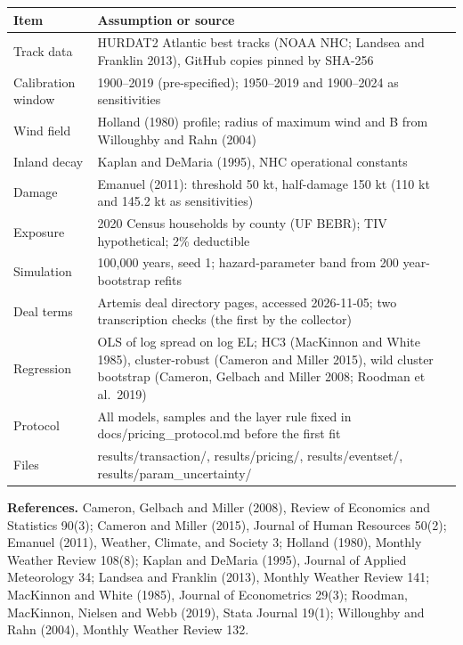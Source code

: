 \documentclass[12pt]{article}
\newcommand{\slide}[1]{\newpage{\color{accent}\Large\textbf{#1}}\par\vspace{2pt}{\color{accent}\rule{\linewidth}{1pt}}\par\vspace{4pt}}
\begin{document}
\slide{Appendix: assumptions and sources}
\small
\begin{tabularx}{\linewidth}{@{}lX@{}}
\toprule
Item & Assumption or source \\
\midrule
Track data & HURDAT2 Atlantic best tracks (NOAA NHC; Landsea and Franklin 2013), GitHub copies pinned by SHA-256 \\
Calibration window & 1900--2019 (pre-specified); 1950--2019 and 1900--2024 as sensitivities \\
Wind field & Holland (1980) profile; radius of maximum wind and B from Willoughby and Rahn (2004) \\
Inland decay & Kaplan and DeMaria (1995), NHC operational constants \\
Damage & Emanuel (2011): threshold 50 kt, half-damage 150 kt (110 kt and 145.2 kt as sensitivities) \\
Exposure & 2020 Census households by county (UF BEBR); TIV hypothetical; 2\% deductible \\
Simulation & 100,000 years, seed 1; hazard-parameter band from 200 year-bootstrap refits \\
Deal terms & Artemis deal directory pages, accessed 2026-11-05; two transcription checks (the first by the collector) \\
Regression & OLS of log spread on log EL; HC3 (MacKinnon and White 1985), cluster-robust
(Cameron and Miller 2015), wild cluster bootstrap (Cameron, Gelbach and Miller 2008; Roodman et al.\ 2019) \\
Protocol & All models, samples and the layer rule fixed in docs/pricing\_protocol.md before the first fit \\
Files & results/transaction/, results/pricing/, results/eventset/, results/param\_uncertainty/ \\
\bottomrule
\end{tabularx}\par\vspace{6pt}
\textbf{References.} Cameron, Gelbach and Miller (2008), Review of Economics and Statistics
90(3); Cameron and Miller (2015), Journal of Human Resources 50(2); Emanuel (2011), Weather,
Climate, and Society 3; Holland (1980), Monthly Weather Review 108(8); Kaplan and DeMaria (1995),
Journal of Applied Meteorology 34; Landsea and Franklin (2013), Monthly Weather Review 141;
MacKinnon and White (1985), Journal of Econometrics 29(3); Roodman, MacKinnon, Nielsen and Webb
(2019), Stata Journal 19(1); Willoughby and Rahn (2004), Monthly Weather Review 132.
\end{document}
